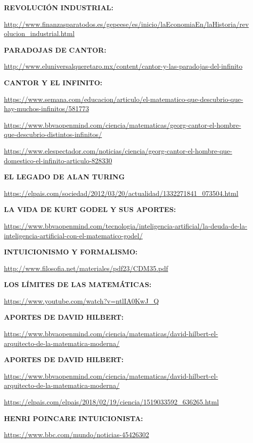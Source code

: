 \documentclass[11pt,letterpaper]{article}
\begin{document}
\begin{thebibliography}{99}


\bibitem{}
\textbf{REVOLUCIÓN INDUSTRIAL:} 

\url{http://www.finanzasparatodos.es/gepeese/es/inicio/laEconomiaEn/laHistoria/revolucion_industrial.html}

\bibitem{}
\textbf{PARADOJAS DE CANTOR: } 

\url{http://www.eluniversalqueretaro.mx/content/cantor-y-las-paradojas-del-infinito}

\bibitem{}
\textbf{CANTOR Y EL INFINITO: } 

\url{https://www.semana.com/educacion/articulo/el-matematico-que-descubrio-que-hay-muchos-infinitos/581773}

\url{https://www.bbvaopenmind.com/ciencia/matematicas/georg-cantor-el-hombre-que-descubrio-distintos-infinitos/}

\url{https://www.elespectador.com/noticias/ciencia/georg-cantor-el-hombre-que-domestico-el-infinito-articulo-828330}

\bibitem{}
\textbf{EL LEGADO DE ALAN TURING } 

\url{https://elpais.com/sociedad/2012/03/20/actualidad/1332271841_073504.html}

\bibitem{}
\textbf{LA VIDA DE KURT GODEL Y SUS APORTES: } 

\url{https://www.bbvaopenmind.com/tecnologia/inteligencia-artificial/la-deuda-de-la-inteligencia-artificial-con-el-matematico-godel/}

\bibitem{}
\textbf{INTUICIONISMO Y FORMALISMO:  } 

\url{http://www.filosofia.net/materiales/pdf23/CDM35.pdf}

\bibitem{}
\textbf{LOS LÍMITES DE LAS MATEMÁTICAS: } 

\url{https://www.youtube.com/watch?v=ntlIA0KwJ_Q}

\bibitem{}
\textbf{APORTES DE DAVID HILBERT: } 

\url{https://www.bbvaopenmind.com/ciencia/matematicas/david-hilbert-el-arquitecto-de-la-matematica-moderna/}

\bibitem{}
\textbf{APORTES DE DAVID HILBERT: } 

\url{https://www.bbvaopenmind.com/ciencia/matematicas/david-hilbert-el-arquitecto-de-la-matematica-moderna/}

\url{https://elpais.com/elpais/2018/02/19/ciencia/1519033592_636265.html}

\bibitem{}
\textbf{HENRI POINCARE INTUICIONISTA:  } 

\url{https://www.bbc.com/mundo/noticias-45426302}

\end{thebibliography}
\end{document}
